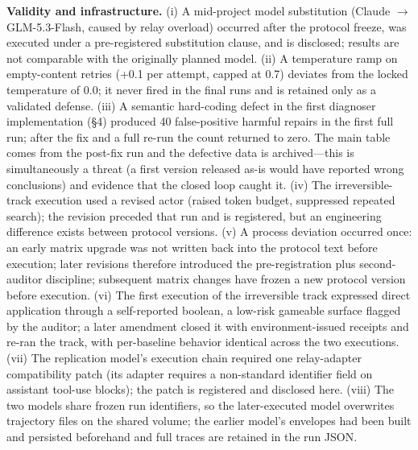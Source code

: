 \documentclass[review]{fcs}
\begin{document}
\textbf{Validity and infrastructure.} (i) A mid-project model substitution (Claude $\to$ GLM-5.3-Flash, caused by relay overload) occurred after the protocol freeze, was executed under a pre-registered substitution clause, and is disclosed; results are not comparable with the originally planned model. (ii) A temperature ramp on empty-content retries (+0.1 per attempt, capped at 0.7) deviates from the locked temperature of 0.0; it never fired in the final runs and is retained only as a validated defense. (iii) A semantic hard-coding defect in the first diagnoser implementation (\S4) produced 40 false-positive harmful repairs in the first full run; after the fix and a full re-run the count returned to zero. The main table comes from the post-fix run and the defective data is archived---this is simultaneously a threat (a first version released as-is would have reported wrong conclusions) and evidence that the closed loop caught it. (iv) The irreversible-track execution used a revised actor (raised token budget, suppressed repeated search); the revision preceded that run and is registered, but an engineering difference exists between protocol versions. (v) A process deviation occurred once: an early matrix upgrade was not written back into the protocol text before execution; later revisions therefore introduced the pre-registration plus second-auditor discipline; subsequent matrix changes have frozen a new protocol version before execution. (vi) The first execution of the irreversible track expressed direct application through a self-reported boolean, a low-risk gameable surface flagged by the auditor; a later amendment closed it with environment-issued receipts and re-ran the track, with per-baseline behavior identical across the two executions. (vii) The replication model's execution chain required one relay-adapter compatibility patch (its adapter requires a non-standard identifier field on assistant tool-use blocks); the patch is registered and disclosed here. (viii) The two models share frozen run identifiers, so the later-executed model overwrites trajectory files on the shared volume; the earlier model's envelopes had been built and persisted beforehand and full traces are retained in the run JSON.
\end{document}
